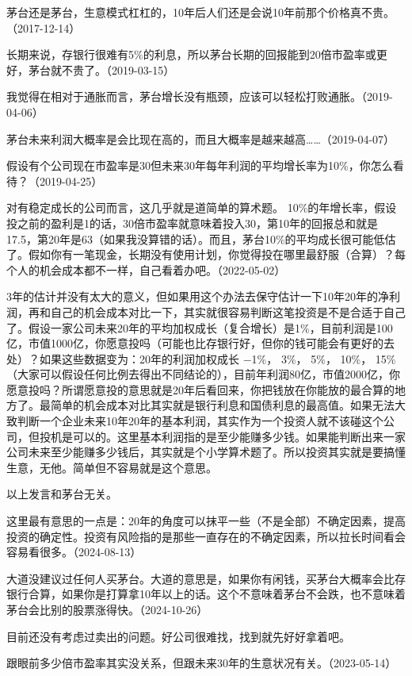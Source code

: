 茅台还是茅台，生意模式杠杠的，10年后人们还是会说10年前那个价格真不贵。（2017-12-14）


长期来说，存银行很难有5\%的利息，所以茅台长期的回报能到20倍市盈率或更好，茅台就不贵了。（2019-03-15）


我觉得在相对于通胀而言，茅台增长没有瓶颈，应该可以轻松打败通胀。（2019-04-06）


茅台未来利润大概率是会比现在高的，而且大概率是越来越高……（2019-04-07）


假设有个公司现在市盈率是30但未来30年每年利润的平均增长率为10\%，你怎么看待？（2019-04-25）

对有稳定成长的公司而言，这几乎就是道简单的算术题。 10\%的年增长率，假设投之前的盈利是1的话，30倍市盈率就意味着投入30，第10年的回报总和就是17.5，第20年是63（如果我没算错的话）。而且，茅台10\%的平均成长很可能低估了。假如你有一笔现金，长期没有使用计划，你觉得投在哪里最舒服（合算）？每个人的机会成本都不一样，自己看着办吧。（2022-05-02）


3年的估计并没有太大的意义，但如果用这个办法去保守估计一下10年20年的净利润，再和自己的机会成本对比一下，其实就很容易判断这笔投资是不是合适于自己了。假设一家公司未来20年的平均加权成长（复合增长）是1\%，目前利润是100亿，市值1000亿，你愿意投吗（可能也比存银行好，但你的钱可能会有更好的去处）？如果这些数据变为：20年的利润加权成长 \( - \)1\%， 3\%， 5\%， 10\%， 15\% （大家可以假设任何比例去得出不同结论的），目前年利润80亿，市值2000亿，你愿意投吗？所谓愿意投的意思就是20年后看回来，你把钱放在你能放的最合算的地方了。最简单的机会成本对比其实就是银行利息和国债利息的最高值。如果无法大致判断一个企业未来10年20年的基本利润，其实作为一个投资人就不该碰这个公司，但投机是可以的。这里基本利润指的是至少能赚多少钱。如果能判断出来一家公司未来至少能赚多少钱后，其实就是个小学算术题了。所以投资其实就是要搞懂生意，无他。简单但不容易就是这个意思。

以上发言和茅台无关。

这里最有意思的一点是：20年的角度可以抹平一些（不是全部）不确定因素，提高投资的确定性。投资有风险指的是那些一直存在的不确定因素，所以拉长时间看会容易看很多。（2024-08-13）

大道没建议过任何人买茅台。大道的意思是，如果你有闲钱，买茅台大概率会比存银行合算，如果你是打算拿10年以上的话。这个不意味着茅台不会跌，也不意味着茅台会比别的股票涨得快。（2024-10-26）


目前还没有考虑过卖出的问题。好公司很难找，找到就先好好拿着吧。

跟眼前多少倍市盈率其实没关系，但跟未来30年的生意状况有关。（2023-05-14）
